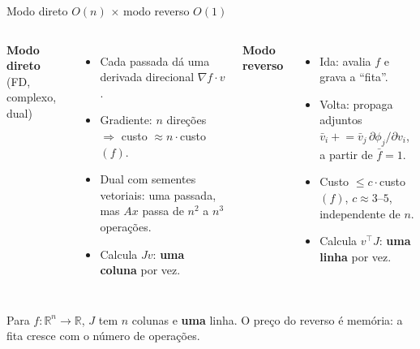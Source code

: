 \documentclass[aspectratio=169,11pt]{beamer}
\begin{document}
\begin{frame}{Modo direto $O(n)$ $\times$ modo reverso $O(1)$}
  \begin{columns}[T]
    \textbf{Modo direto} (FD, complexo, dual)
    \begin{itemize}
      \item Cada passada dá uma derivada direcional $\nabla f\cdot v$.
      \item Gradiente: $n$ direções $\Rightarrow$ custo $\approx n\cdot$custo$(f)$.
      \item Dual com sementes vetoriais: uma passada, mas $Ax$ passa de $n^2$ a $n^3$ operações.
      \item Calcula $Jv$: \textbf{uma coluna} por vez.
    \end{itemize}
    \textbf{Modo reverso}
    \begin{itemize}
      \item Ida: avalia $f$ e grava a ``fita''.
      \item Volta: propaga adjuntos $\bar v_i \mathrel{+}= \bar v_j\,\partial\phi_j/\partial v_i$, a partir de $\bar f=1$.
      \item Custo $\le c\cdot$custo$(f)$, $c\approx3$--$5$, \alert{independente de $n$}.
      \item Calcula $v^\top J$: \textbf{uma linha} por vez.
    \end{itemize}
  \end{columns}
  \vspace{0.8em}
  \begin{block}{}
    Para $f:\mathbb R^n\to\mathbb R$, $J$ tem $n$ colunas e \textbf{uma} linha. O preço do reverso é memória: a fita cresce com o número de operações.
  \end{block}
\end{frame}
\end{document}

